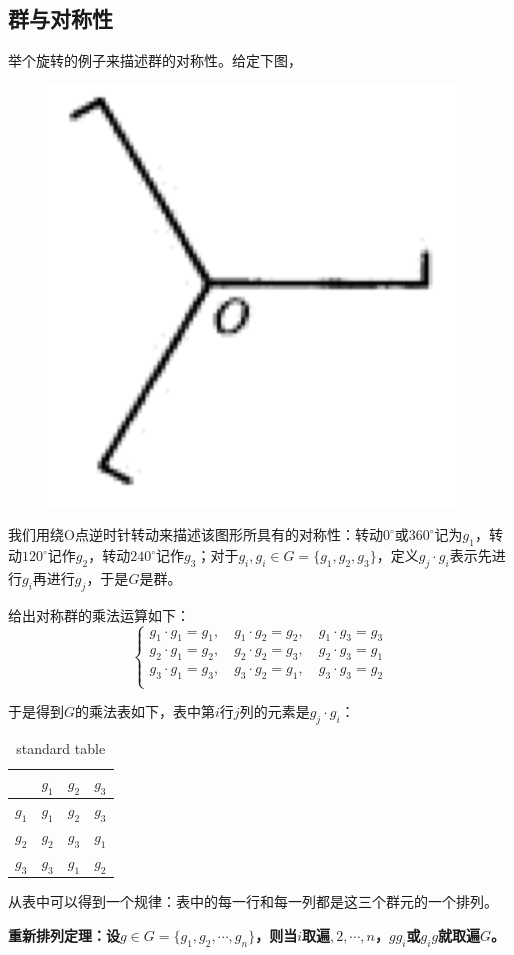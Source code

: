 \documentclass[12pt]{article}
\begin{document}
\subsection{群与对称性}
\begin{framed}
举个旋转的例子来描述群的对称性。给定下图，
\begin{figure}[H]
    \centering
    \includegraphics[width=.1\textwidth]{fig/FromLinearEquationToGaloisTheory_RotationExample.png}
\end{figure}
我们用绕O点逆时针转动来描述该图形所具有的对称性：转动$0^\circ$或$360^\circ$记为$g_1$，转动$120^\circ$记作$g_2$，转动$240^\circ$记作$g_3$；对于$g_i, g_i \in G = \{g_1, g_2, g_3\}$，定义$g_j\cdot g_i$表示先进行$g_i$再进行$g_j$，于是$G$是群。

给出对称群的乘法运算如下：
$$
\begin{cases}
g_1 \cdot g_1 = g_1, \quad g_1 \cdot g_2 = g_2, \quad g_1 \cdot g_3 = g_3 \\
g_2 \cdot g_1 = g_2, \quad g_2 \cdot g_2 = g_3, \quad g_2 \cdot g_3 = g_1 \\
g_3 \cdot g_1 = g_3, \quad g_3 \cdot g_2 = g_1, \quad g_3 \cdot g_3 = g_2 \\
\end{cases}
$$

于是得到$G$的乘法表如下，表中第$i$行$j$列的元素是$g_j\cdot g_i$：
\begin{table}[H]
	\centering  %
	\caption{standard table}  %
	\begin{tabular}{c|c c c}
		& $g_1$ & $g_2$ & $g_3$ \\
		\hline
		$g_1$& $g_1$ & $g_2$ & $g_3$\\
		$g_2$& $g_2$ & $g_3$ & $g_1$\\
		$g_3$& $g_3$ & $g_1$ & $g_2$\\
	\end{tabular}
\end{table}

从表中可以得到一个规律：表中的每一行和每一列都是这三个群元的一个排列。
\end{framed}

\begin{mdframed}[
linecolor=black!40,outerlinewidth=1pt,roundcorner=.5em,innertopmargin=1ex,innerbottommargin=.5\baselineskip,innerrightmargin=1em,innerleftmargin=1em,backgroundcolor=gray!5,
]
\textbf{
重新排列定理：设$g \in G = \{g_1, g_2, \cdots, g_n\}$，则当$i$取遍$, 2, \cdots, n$，$gg_i$或$g_ig$就取遍$G$。
}
\end{mdframed}
\end{document}
